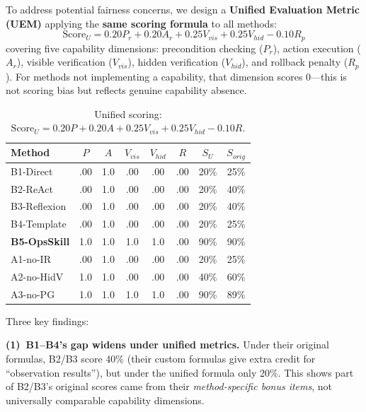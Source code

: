\documentclass[conference,10pt]{IEEEtran}
\begin{document}
To address potential fairness concerns, we design a \textbf{Unified Evaluation Metric (UEM)} applying the \textbf{same scoring formula} to all methods:
\begin{equation}
\text{Score}_U {=} 0.20 P_{r} {+} 0.20 A_{r} {+} 0.25 V_{vis} {+} 0.25 V_{hid} {-} 0.10 R_{p}
\end{equation}
covering five capability dimensions: precondition checking ($P_r$), action execution ($A_r$), visible verification ($V_{vis}$), hidden verification ($V_{hid}$), and rollback penalty ($R_p$).
For methods not implementing a capability, that dimension scores 0---this is not scoring bias but reflects genuine capability absence.

\begin{table}[t]
\centering
\caption{Unified scoring: $\text{Score}_{U} {=} 0.20P {+} 0.20A {+} 0.25V_{vis} {+} 0.25V_{hid} {-} 0.10R$.}
\label{tab:unified-eval}
\footnotesize
\setlength{\tabcolsep}{2.5pt}
\begin{tabular}{lccccccc}
\toprule
\textbf{Method} & $P$ & $A$ & $V_{vis}$ & $V_{hid}$ & $R$ & \textbf{$S_U$} & \textbf{$S_{orig}$} \\
\midrule
B1-Direct & .00 & 1.0 & .00 & .00 & .00 & 20\% & 25\% \\
B2-ReAct & .00 & 1.0 & .00 & .00 & .00 & 20\% & 40\% \\
B3-Reflexion & .00 & 1.0 & .00 & .00 & .00 & 20\% & 40\% \\
B4-Template & .00 & 1.0 & .00 & .00 & .00 & 20\% & 25\% \\
\textbf{B5-OpsSkill} & 1.0 & 1.0 & 1.0 & 1.0 & .00 & 90\% & 90\% \\
A1-no-IR & .00 & 1.0 & .00 & .00 & .00 & 20\% & 25\% \\
A2-no-HidV & 1.0 & 1.0 & .00 & .00 & .00 & 40\% & 60\% \\
A3-no-PG & 1.0 & 1.0 & 1.0 & 1.0 & .00 & 90\% & 89\% \\
\bottomrule
\end{tabular}
\end{table}

Three key findings:

\textbf{(1)~B1--B4's gap widens under unified metrics.}
Under their original formulas, B2/B3 score 40\% (their custom formulas give extra credit for ``observation results''), but under the unified formula only 20\%.
This shows part of B2/B3's original scores came from their \emph{method-specific bonus items}, not universally comparable capability dimensions.
\end{document}
